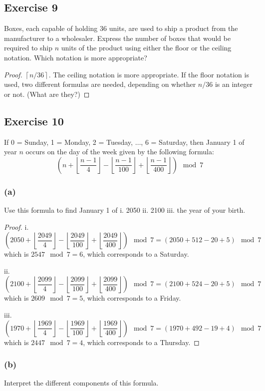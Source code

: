\documentclass[14pt]{extarticle}
\newcommand{\cy}{\color{cyan}}
\newcommand{\floor}[1]{{\left\lfloor#1\right\rfloor}}
\newcommand{\ceil}[1]{{\left\lceil#1\right\rceil}}
\begin{document}
\subsection{Exercise 9}
Boxes, each capable of holding 36 units, are used to ship a product from the manufacturer to a wholesaler. Express the number of boxes that would be required to ship $n$ units of the product using either the floor or the ceiling notation. Which notation is more appropriate?

\begin{proof}
    $\ceil{n/36}$. The ceiling notation is more appropriate. If the floor notation is used, two different formulas are needed, depending on whether $n/36$ is an integer or not. (What are they?)
\end{proof}

\subsection{Exercise 10}
If 0 = Sunday, 1 = Monday, 2 = Tuesday, $\ldots$, 6 = Saturday, then January 1 of year $n$ occurs on the day of the week given by the following formula:
\[
    \left(n + \floor{\frac{n-1}{4}} - \floor{\frac{n-1}{100}} + \floor{\frac{n-1}{400}}\right) \mod 7
\]
\subsubsection{(a)}
Use this formula to find January 1 of {\cy i.} 2050 {\cy ii.} 2100 {\cy iii.} the year of your birth.

\begin{proof}
    {\cy i.}
    \[
        \left(2050 + \floor{\frac{2049}{4}} - \floor{\frac{2049}{100}} + \floor{\frac{2049}{400}}\right) \mod 7 = (2050+512-20+5) \mod 7
    \]
    which is $2547 \mod 7 = 6$, which corresponds to a Saturday.

        {\cy ii.}
    \[
        \left(2100 + \floor{\frac{2099}{4}} - \floor{\frac{2099}{100}} + \floor{\frac{2099}{400}}\right) \mod 7 = (2100+524-20+5) \mod 7
    \]
    which is $2609 \mod 7 = 5$, which corresponds to a Friday.

        {\cy iii.}
    \[
        \left(1970 + \floor{\frac{1969}{4}} - \floor{\frac{1969}{100}} + \floor{\frac{1969}{400}}\right) \mod 7 = (1970+492-19+4) \mod 7
    \]
    which is $2447 \mod 7 = 4$, which corresponds to a Thursday.
\end{proof}

\subsubsection{(b)}
Interpret the different components of this formula.
\end{document}
